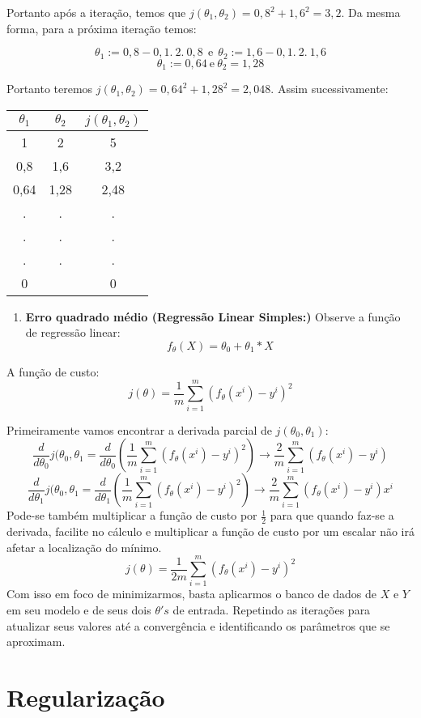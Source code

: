 \documentclass[
  openany]{book}
\providecommand{\tightlist}{%
  \setlength{\itemsep}{0pt}\setlength{\parskip}{0pt}}
\begin{document}
Portanto após a iteração, temos que \(j(\theta_1,\theta_2)=0,8^2+1,6^2=3,2\). Da mesma forma, para a próxima iteração temos:

\[\theta_1:=0,8-0,1.\ 2.\ 0,8 \ \ \mbox{e}\ \ \theta_2:=1,6-0,1.\ 2.\ 1,6\]
\[\theta_1:=0,64 \ \mbox{e} \ \theta_2=1,28\]

Portanto teremos \(j(\theta_1,\theta_2)=0,64^2+1,28^2=2,048\). Assim sucessivamente:

\begin{longtable}[]{@{}ccc@{}}
\toprule
\textbf{\(\theta_1\)} & \textbf{\(\theta_2\)} & \textbf{\(j(\theta_1,\theta_2)\)}\tabularnewline
\midrule
\endhead
1 & 2 & 5\tabularnewline
0,8 & 1,6 & 3,2\tabularnewline
0,64 & 1,28 & 2,48\tabularnewline
. & . & .\tabularnewline
. & . & .\tabularnewline
. & . & .\tabularnewline
0 & & 0\tabularnewline
\bottomrule
\end{longtable}

\begin{enumerate}
\def\labelenumi{\arabic{enumi}.}
\setcounter{enumi}{2}
\tightlist
\item
  \textbf{Erro quadrado médio (Regressão Linear Simples:)} Observe a função de regressão linear:
  \[f_\theta(X)=\theta_0+\theta_1*X\]
\end{enumerate}

A função de custo:
\[j(\theta)=\frac{1}{m}\displaystyle \sum^m_{i=1}(f_\theta(x^i)-y^i)^2\]

Primeiramente vamos encontrar a derivada parcial de \(j(\theta_0,\theta_1)\):
\[\frac{d}{d\theta_0}j(\theta_0,\theta_1=\frac{d}{d\theta_0}(\frac{1}{m}\displaystyle \sum^m_{i=1}(f_{\theta}(x^i)-y^i)^2) \rightarrow \frac{2}{m}\displaystyle \sum^m_{i=1}(f_\theta(x^i)-y^i) \]
\[\frac{d}{d\theta_1}j(\theta_0,\theta_1=\frac{d}{d\theta_1}(\frac{1}{m}\displaystyle \sum^m_{i=1}(f_{\theta}(x^i)-y^i)^2) \rightarrow \frac{2}{m}\displaystyle \sum^m_{i=1}(f_\theta(x^i)-y^i)x^i\]
Pode-se também multiplicar a função de custo por \(\frac{1}{2}\) para que quando faz-se a derivada, facilite no cálculo e multiplicar a função de custo por um escalar não irá afetar a localização do mínimo.
\[j(\theta)=\frac{1}{2m}\displaystyle \sum^m_{i=1}(f_\theta(x^i)-y^i)^2\]
Com isso em foco de minimizarmos, basta aplicarmos o banco de dados de \(X\) e \(Y\) em seu modelo e de seus dois \(\theta's\) de entrada. Repetindo as iterações para atualizar seus valores até a convergência e identificando os parâmetros que se aproximam.

\hypertarget{regularizacao}{%
\section{Regularização}\label{regularizacao}}
\end{document}
